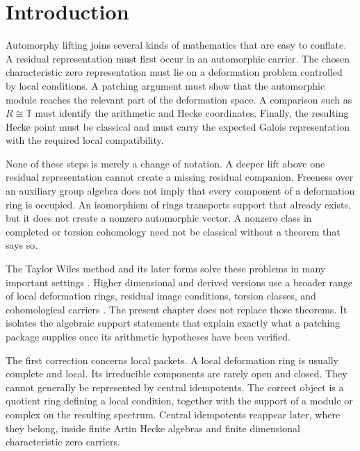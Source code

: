 \documentclass[11pt]{amsart}
\theoremstyle{definition}
\theoremstyle{remark}
\newcommand{\TT}{\mathbb T}
\begin{document}
\section{Introduction}\label{sec:introduction}

Automorphy lifting joins several kinds of mathematics that are easy to conflate. A residual representation must first occur in an automorphic carrier. The chosen characteristic zero representation must lie on a deformation problem controlled by local conditions. A patching argument must show that the automorphic module reaches the relevant part of the deformation space. A comparison such as \(R\cong\TT\) must identify the arithmetic and Hecke coordinates. Finally, the resulting Hecke point must be classical and must carry the expected Galois representation with the required local compatibility.

None of these steps is merely a change of notation. A deeper lift above one residual representation cannot create a missing residual companion. Freeness over an auxiliary group algebra does not imply that every component of a deformation ring is occupied. An isomorphism of rings transports support that already exists, but it does not create a nonzero automorphic vector. A nonzero class in completed or torsion cohomology need not be classical without a theorem that says so.

The Taylor Wiles method and its later forms solve these problems in many important settings \cite{Wiles1995,TaylorWiles1995,Diamond1997,Kisin2009,Gee2022}. Higher dimensional and derived versions use a broader range of local deformation rings, residual image conditions, torsion classes, and cohomological carriers \cite{ClozelHarrisTaylor2008,BarnetLambGeeGeraghtyTaylor2014,CalegariGeraghty2018,Thorne2012,MiagkovThorne2023,Scholze2015,CaraianiScholze2017,NewtonThorne2016}. The present chapter does not replace those theorems. It isolates the algebraic support statements that explain exactly what a patching package supplies once its arithmetic hypotheses have been verified.

The first correction concerns local packets. A local deformation ring is usually complete and local. Its irreducible components are rarely open and closed. They cannot generally be represented by central idempotents. The correct object is a quotient ring defining a local condition, together with the support of a module or complex on the resulting spectrum. Central idempotents reappear later, where they belong, inside finite Artin Hecke algebras and finite dimensional characteristic zero carriers.
\end{document}
